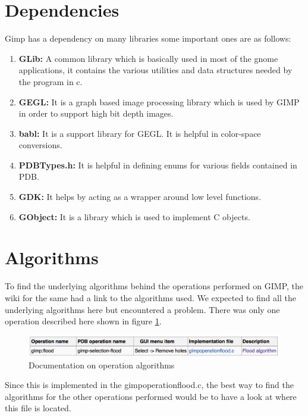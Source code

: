 \section{Dependencies}
Gimp has a dependency on many libraries some important ones are as follows:
\begin{enumerate}
\item \textbf{GLib:} \newline
A common library which is basically used in most of the gnome applications, it contains the various utilities and data structures needed by the program in c.
\item \textbf{GEGL:} \newline
It is a graph based image processing library which is used by GIMP in order to support high bit depth images.
\item \textbf{babl:} \newline
It is a support library for GEGL. It is helpful in color-space conversions.
\item \textbf{PDBTypes.h:} \newline
It is helpful in defining enums for various fields contained in PDB.
\item \textbf{GDK:} \newline
It helps by acting as a wrapper around low level functions.
\item \textbf{GObject:} \newline
It is a library which is used to implement C objects.
\end{enumerate}

\section{Algorithms}
To find the underlying algorithms behind the operations performed on GIMP, the wiki for the same had a link to the algorithms used. We expected to find all the underlying algorithms here but encountered a problem. There was only one operation described here shown in figure \ref{fig:algorithm}.

\begin{figure}
\centering
\includegraphics[width=1\textwidth]{algorithm.png}
\caption{\label{fig:algorithm}Documentation on operation algorithms}
\end{figure}

Since this is implemented in the gimpoperationflood.c, the best way to find the algorithms for the other operations performed would be to have a look at where this file is located.
 
